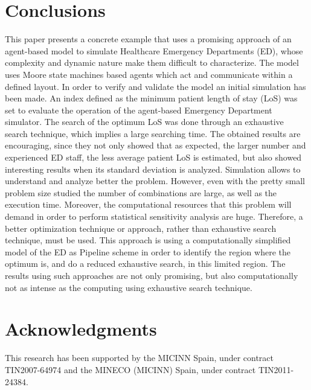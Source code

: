 \documentclass[11pt]{article} %
\begin{document}
\section{Conclusions}
\label{sec:conclu}

This paper presents a concrete example that uses a promising approach of an agent-based model to simulate Healthcare Emergency 
Departments (ED), whose complexity and dynamic nature make them difficult to characterize.  The model uses Moore state machines 
based agents which act and communicate within a defined layout. In order to verify and validate the model an initial simulation has 
been made. 
An index defined as the minimum patient length of stay (LoS) was set to evaluate the operation of the agent-based Emergency 
Department simulator. The search of the optimum LoS was done through an exhaustive search technique, which implies a large 
searching time. The obtained results are encouraging, since they not only showed that as expected, the larger number and 
experienced ED staff, the less average patient LoS is estimated, but also showed interesting results when its standard deviation is 
analyzed. Simulation allows to understand and analyze better the problem. However, even with the pretty small problem size studied 
the number of combinations are large, as well as the execution time. Moreover, the computational resources that this problem will 
demand in order to perform statistical sensitivity analysis are huge. Therefore, a better optimization technique or approach, rather than exhaustive search technique, must be used. This approach is using a computationally simplified model of the ED as  Pipeline scheme in order to identify the region where the optimum is, and do a reduced exhaustive search, in this limited region. The results using such approaches are not only promising, but also computationally not as intense as the computing using exhaustive search technique. 


\section*{Acknowledgments}
This research has been supported by the MICINN Spain, under contract TIN2007-64974 and the MINECO (MICINN) Spain, under contract TIN2011-24384.
 


\end{document}
